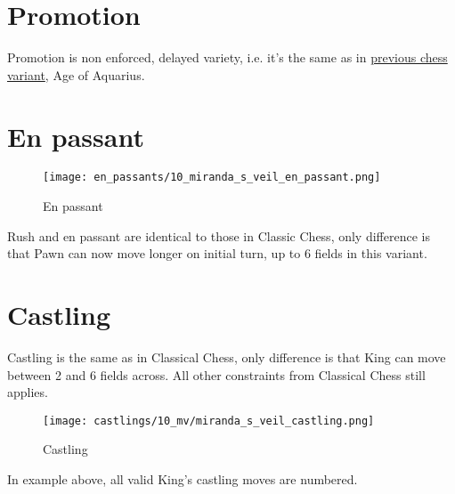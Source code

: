 \clearpage %

\section*{Promotion}

Promotion is non enforced, delayed variety, i.e. it's the same as in
\hyperref[sec:Age of Aquarius/Promotion]{previous chess variant}, Age of Aquarius.

\clearpage %

\section*{En passant}

\noindent
\begin{wrapfigure}{l}{0.4\textwidth}
\centering
\texttt{[image: en\_passants/10\_miranda\_s\_veil\_en\_passant.png]}
\caption{En passant}
\label{fig:10_miranda_s_veil_en_passant}
\end{wrapfigure}
Rush and en passant are identical to those in Classic Chess, only difference
is that Pawn can now move longer on initial turn, up to 6 fields in this
variant.

\clearpage %

\section*{Castling}

Castling is the same as in Classical Chess, only difference is that King can move between 2 and 6 fields across.
All other constraints from Classical Chess still applies.

\noindent
\begin{figure}[!h]
\texttt{[image: castlings/10\_mv/miranda\_s\_veil\_castling.png]}
\caption{Castling}
\label{fig:miranda_s_veil_castling}
\end{figure}

In example above, all valid King's castling moves are numbered.

